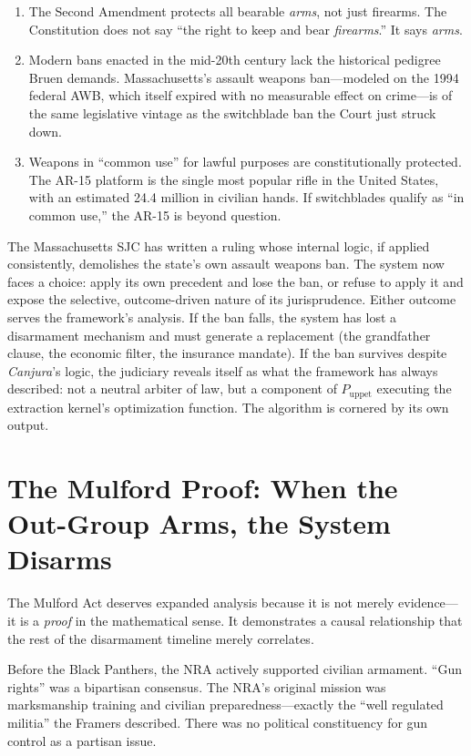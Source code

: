 \documentclass[12pt,openany]{book}
\begin{document}
\begin{enumerate}
    \item The Second Amendment protects all bearable \textit{arms}, not just firearms. The Constitution does not say ``the right to keep and bear \textit{firearms}.'' It says \textit{arms}.
    \item Modern bans enacted in the mid-20th century lack the historical pedigree Bruen demands. Massachusetts's assault weapons ban---modeled on the 1994 federal AWB, which itself expired with no measurable effect on crime---is of the same legislative vintage as the switchblade ban the Court just struck down.
    \item Weapons in ``common use'' for lawful purposes are constitutionally protected. The AR-15 platform is the single most popular rifle in the United States, with an estimated 24.4 million in civilian hands. If switchblades qualify as ``in common use,'' the AR-15 is beyond question.
\end{enumerate}

The Massachusetts SJC has written a ruling whose internal logic, if applied consistently, demolishes the state's own assault weapons ban. The system now faces a choice: apply its own precedent and lose the ban, or refuse to apply it and expose the selective, outcome-driven nature of its jurisprudence. Either outcome serves the framework's analysis. If the ban falls, the system has lost a disarmament mechanism and must generate a replacement (the grandfather clause, the economic filter, the insurance mandate). If the ban survives despite \textit{Canjura}'s logic, the judiciary reveals itself as what the framework has always described: not a neutral arbiter of law, but a component of $P_{\text{uppet}}$ executing the extraction kernel's optimization function. The algorithm is cornered by its own output.

\section{The Mulford Proof: When the Out-Group Arms, the System Disarms}
\label{sec:mulford_expanded}

The Mulford Act deserves expanded analysis because it is not merely evidence---it is a \textit{proof} in the mathematical sense. It demonstrates a causal relationship that the rest of the disarmament timeline merely correlates.

Before the Black Panthers, the NRA actively supported civilian armament. ``Gun rights'' was a bipartisan consensus. The NRA's original mission was marksmanship training and civilian preparedness---exactly the ``well regulated militia'' the Framers described. There was no political constituency for gun control as a partisan issue.
\end{document}
